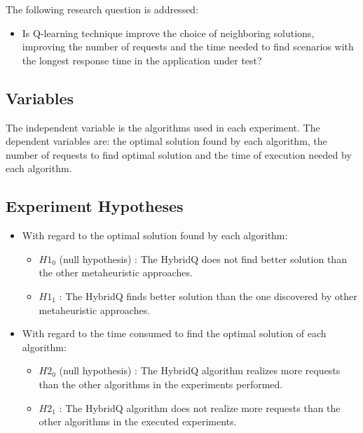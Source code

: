 \documentclass[espaco=umemeio,chapter=TITLE,twoside,openright]{abnt}
\begin{document}
The following research question is addressed:

\begin{itemize}
\item Is Q-learning technique improve the choice of neighboring solutions, improving the number of requests and the time needed to find scenarios with the longest response time in the application under test?
\end{itemize}

\subsection{Variables}

The independent variable is the algorithms used in each experiment. The dependent variables are: the optimal solution found by each algorithm, the number of requests to find optimal solution and the time of execution needed by each algorithm.

\subsection{Experiment Hypotheses}

\begin{itemize}
\item With regard to the optimal solution found by each algorithm:
\begin{itemize}
\item $H1_{0}$ (null hypothesis) : The HybridQ does not find better solution than the other metaheuristic approaches.
\item $H1_{1}$  : The HybridQ finds better solution than the one discovered by other metaheuristic approaches.
\end{itemize}
\end{itemize}


\begin{itemize}
\item With regard to the time consumed to find the optimal solution of each algorithm:
\begin{itemize}
\item $H2_{0}$ (null hypothesis) : The HybridQ algorithm realizes more requests than the other algorithms in the experiments performed.
\item $H2_{1}$  : The HybridQ algorithm does not realize more requests than the other algorithms in the executed experiments.
\end{itemize}
\end{itemize}
\end{document}
